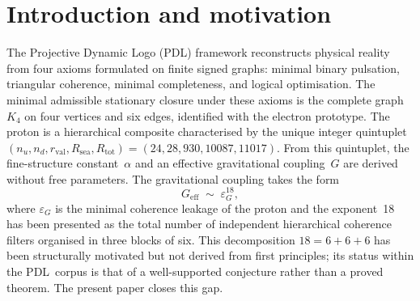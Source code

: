 \documentclass[11pt,a4paper]{article}
\theoremstyle{definition}
\newcommand{\PDL}{\textnormal{PDL}}
\newcommand{\Rsea}{R_{\mathrm{sea}}}
\newcommand{\Rtot}{R_{\mathrm{tot}}}
\newcommand{\rval}{r_{\mathrm{val}}}
\newcommand{\epsg}{\varepsilon_G}
\newcommand{\Kfour}{K_4}
\newcommand{\Sfour}{\partial\Delta^3}
\newcommand{\Efun}{E}
\newcommand{\Shell}{\mathrm{Shell}}
\begin{document}
\begin{abstract}
the simplicial boundary $\Sfour = S^2$ to impose a rank deficit of~1 at each hierarchical \PDL\ transition. Going further, we establish exact closed-form expressions $\Efun(n) = n(n^2+3)/2$ for the \PDL\ gravitational exponent and $\Shell(n) = 3\binom{2n-2}{n-1}$ for the maximum shell occupancy in a $\mathbb{R}^n$-based framework, and prove that $\Efun(n) = \Shell(n)$ if and only if $n \in \{1,\,3\}$: our universe is the unique non-trivial dimension in which the gravitational coupling structure and the atomic shell structure are governed by the same topological integer. All calculations are performed without free parameters over $\mathbb{Q}(\sqrt{5})$ using exact symbolic arithmetic.
\end{abstract}
\section{Introduction and motivation}
\label{sec:intro}
The Projective Dynamic Logo (\PDL) framework reconstructs physical reality from four axioms formulated on finite signed graphs: minimal binary pulsation, triangular coherence, minimal completeness, and logical optimisation.\cite{PDL_Main_2026,PDL_Intro_2026} The minimal admissible stationary closure under these axioms is the complete graph $\Kfour$ on four vertices and six edges, identified with the electron prototype.\cite{PDL_Main_2026} The proton is a hierarchical composite characterised by the unique integer quintuplet $(n_u, n_d, \rval, \Rsea, \Rtot) = (24, 28, 930, 10087, 11017)$.\cite{Combinatorial_Proton_v2_2026} From this quintuplet, the fine-structure constant~$\alpha$ and an effective gravitational coupling~$G$ are derived without free parameters.\cite{Alpha_PDL_v2_2026,Bridge_Formula_PDL_2026} The gravitational coupling takes the form
\begin{equation}
  \label{eq:G_eps18}
  G_{\mathrm{eff}} \;\sim\; \epsg^{18},
\end{equation}
where $\epsg$ is the minimal coherence leakage of the proton and the exponent~18 has been presented as the total number of independent hierarchical coherence filters organised in three blocks of six.\cite{Exponent_18_PDL_2026} This decomposition $18 = 6 + 6 + 6$ has been structurally motivated but not derived from first principles; its status within the \PDL\ corpus is that of a well-supported conjecture rather than a proved theorem.\cite{Exponent_18_PDL_2026,PDL_Global_Mapping_2026} The present paper closes this gap.
\end{document}
